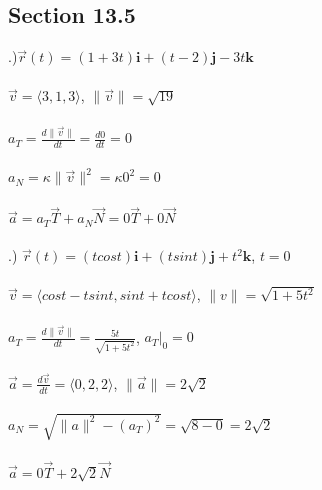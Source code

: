 \documentclass[12pt]{article}
\begin{document}
 \clearpage



\subsection*{Section 13.5}
.)$\vec{r}(t) = (1 + 3t)\mathbf{i} + (t - 2)\mathbf{j} - 3t\mathbf{k}$\\\\
\noindent $\vec{v} = \langle 3, 1, 3\rangle$, \hspace{10pt} $\| \vec{v} \| = \sqrt{19}$\\\\
\noindent $a_{T} = \frac{d\|\vec{v} \|}{dt} = \frac{d0}{dt} = 0$\\\\
\noindent $a_{N} = \kappa \| \vec{v} \|^{2} = \kappa 0^{2} = 0$\\\\
\noindent $\vec{a} = a_{T}\vec{T} + a_{N}\vec{N} = 0\vec{T} + 0\vec{N}$\\\\

.) $\vec{r}(t) = (tcos{t})\mathbf{i} + (tsin{t})\mathbf{j} + t^{2}\mathbf{k}$, \hspace{10pt} $t = 0$\\\\
\noindent $\vec{v} = \langle cos{t} - tsin{t}, sin{t} + tcos{t}\rangle$, \hspace{10pt} $\| v\| = \sqrt{1+5t^{2}}$\\\\
\noindent $a_{T} = \frac{d\|\vec{v} \| }{dt} = \frac{5t}{\sqrt{1+5t^{2}}}$, \hspace{10pt} $a_{T}\Big|_{0} = 0$\\\\
\noindent $\vec{a} = \frac{d\vec{v}}{dt} = \langle 0, 2, 2\rangle$, \hspace{10pt} $\| \vec{a}\|  =2\sqrt{2}$\\\\
\noindent $a_{N} = \sqrt{\| a \| ^{2} - (a_{T})^{2}} = \sqrt{8 - 0} = 2\sqrt{2}$\\\\
\noindent $\vec{a} = 0\vec{T} + 2\sqrt{2}\vec{N}$\\\\
\end{document}
